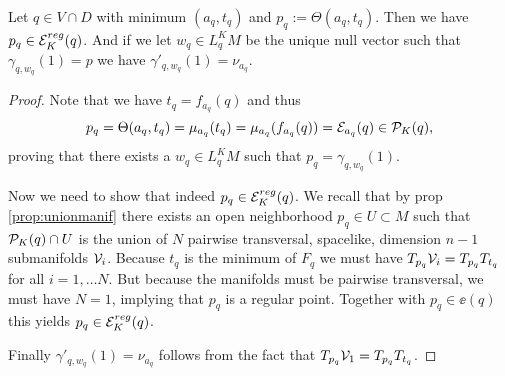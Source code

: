 \begin{lemma}
    Let $q\in V\cap D$ with minimum $(a_q,t_q)$ and $p_q:=\Theta(a_q,t_q)$. Then we have $p_q\in {{\mathcal{E}}^{reg}_K}(q)$. And if we let $w_q\in L^K_qM$ be the unique null vector such that $\gamma_{q,w_q}(1)=p$ we have $\gamma'_{q,w_q}(1)=\nu_{a_q}$.
\end{lemma}
\begin{proof}
    Note that we have $t_q = f_{a_q}(q)$ and thus 
    \[
        p_q = \Theta(a_q,t_q)=\mu_{a_q}(t_q) = \mu_{a_q}(f_{a_q}(q)) = {\mathcal{E}}_{a_q}(q)\in {{\mathcal{P}}_K(q)},
    \] proving that there exists a $w_q\in L^K_qM$ such that $p_q = \gamma_{q,w_q}(1)$. 

    Now we need to show that indeed $p_q\in {{\mathcal{E}}^{reg}_K}(q)$.
    We recall that by prop \ref{prop:unionmanif} there exists an open neighborhood $p_q\in U\subset M$ such that ${\mathcal{P}}_K(q)\cap U$ is the union of $N$ pairwise transversal, spacelike, dimension $n-1$ submanifolds ${\mathcal{V}}_i$. Because $t_q$ is the minimum of $F_q$ we must have $T_{p_q}{{\mathcal{V}}_i} = T_{p_q}{T_{t_q}}$ for all $i=1,\dots N$. But because the manifolds must be pairwise transversal, we must have $N=1$, implying that $p_q$ is a regular point. Together with $p_q\in \ee(q)$ this yields $p_q \in {{\mathcal{E}}^{reg}_K}(q)$.

    Finally $\gamma'_{q,w_q}(1)=\nu_{a_q}$ follows from the fact that $T_{p_q}{{\mathcal{V}}_1} = T_{p_q}{T_{t_q}}$.
\end{proof}

